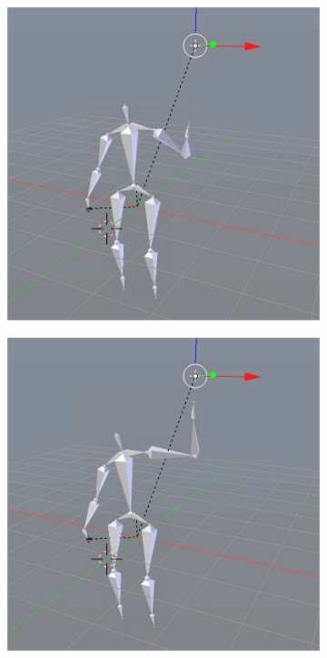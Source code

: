 \documentclass[10pt,twocolumn,letterpaper]{article}
\begin{document}
\begin{figure}[]
\begin{subfigure}{0.2\textwidth}
        \centering
        \includegraphics[width=.9\linewidth]{raise-linear-2.jpg}
    \end{subfigure}\begin{subfigure}{0.2\textwidth}
        \centering
        \includegraphics[width=.9\linewidth]{raise-linear-3.jpg}
    \end{subfigure}\begin{subfigure}{0.2\textwidth}

\end{subfigure}
\end{figure}
\end{document}
